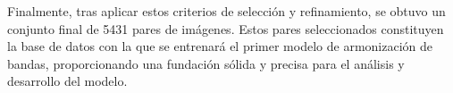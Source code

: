                 Finalmente, tras aplicar estos criterios de selección y refinamiento, se obtuvo un conjunto final de 5431 pares de imágenes. Estos pares seleccionados constituyen la base de datos con la que se entrenará el primer modelo de armonización de bandas, proporcionando una fundación sólida y precisa para el análisis y desarrollo del modelo.
                




